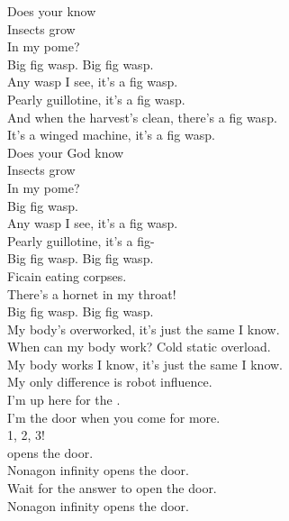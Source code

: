 Does your  know \\
Insects grow \\
In my pome? \\

Big fig wasp. Big fig wasp. \\

Any wasp I see, it's a fig wasp. \\
Pearly guillotine, it's a fig wasp. \\
And when the harvest's clean, there's a fig wasp. \\
It's a winged machine, it's a fig wasp. \\

Does your God know \\
Insects grow \\
In my pome? \\

Big fig wasp. \\

Any wasp I see, it's a fig wasp. \\
Pearly guillotine, it's a fig- \\

Big fig wasp. Big fig wasp. \\

Ficain eating corpses. \\
There's a hornet in my throat! \\

Big fig wasp. Big fig wasp. \\

My body's overworked, it's just the same I know. \\
When can my body work? Cold static overload. \\
My body works I know, it's just the same I know. \\
My only difference is robot influence. \\

I'm up here for the . \\
I'm the door when you come for more. \\

1, 2, 3! \\

 opens the door. \\
Nonagon infinity opens the door. \\
Wait for the answer to open the door. \\
Nonagon infinity opens the door. \\

